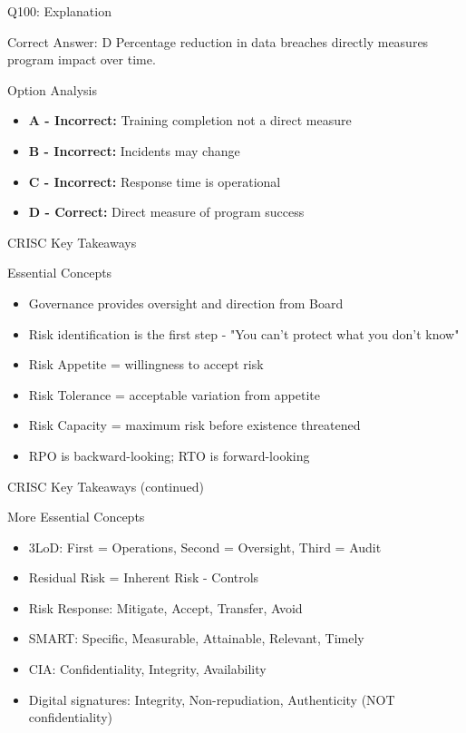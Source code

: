 \documentclass{beamer}
\begin{document}
	\begin{frame}{Q100: Explanation}
		\begin{block}{Correct Answer: D}
			Percentage reduction in data breaches directly measures program impact over time.
		\end{block}
		\begin{block}{Option Analysis}
			\begin{itemize}
				\item \textbf{A - Incorrect:} Training completion not a direct measure
				\item \textbf{B - Incorrect:} Incidents may change
				\item \textbf{C - Incorrect:} Response time is operational
				\item \textbf{D - Correct:} Direct measure of program success
			\end{itemize}
		\end{block}
	\end{frame}
	
	
	\begin{frame}{CRISC Key Takeaways}
		\begin{block}{Essential Concepts}
			\begin{itemize}
				\item Governance provides oversight and direction from Board
				\item Risk identification is the first step - "You can't protect what you don't know"
				\item Risk Appetite = willingness to accept risk
				\item Risk Tolerance = acceptable variation from appetite
				\item Risk Capacity = maximum risk before existence threatened
				\item RPO is backward-looking; RTO is forward-looking
			\end{itemize}
		\end{block}
	\end{frame}
	
	\begin{frame}{CRISC Key Takeaways (continued)}
		\begin{block}{More Essential Concepts}
			\begin{itemize}
				\item 3LoD: First = Operations, Second = Oversight, Third = Audit
				\item Residual Risk = Inherent Risk - Controls
				\item Risk Response: Mitigate, Accept, Transfer, Avoid
				\item SMART: Specific, Measurable, Attainable, Relevant, Timely
				\item CIA: Confidentiality, Integrity, Availability
				\item Digital signatures: Integrity, Non-repudiation, Authenticity (NOT confidentiality)
			\end{itemize}
		\end{block}
	\end{frame}
	
\end{document}
